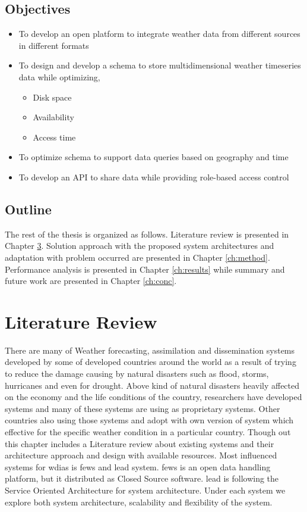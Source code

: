 \documentclass[a4paper,oneside,12pt]{report}
\begin{document}
\section{Objectives}
\begin{itemize}
    \item To develop an open platform to integrate weather data from different sources in different formats
    \item To design and develop a schema to store multidimensional weather timeseries data while optimizing,
    \begin{itemize}
        \item Disk space
        \item Availability
        \item Access time
    \end{itemize}
    \item To optimize schema to support data queries based on geography and time
    \item To develop an API to share data while providing role-based access control
\end{itemize}

\section{Outline}
The rest of the thesis is organized as follows. Literature review is presented in Chapter \ref{ch:literature}. Solution approach with the proposed system architectures and adaptation with problem occurred are presented in Chapter \ref{ch:method}. Performance analysis is presented in Chapter \ref{ch:results} while summary and future work are presented in Chapter \ref{ch:conc}.

\chapter{Literature Review}
\label{ch:literature}
There are many of Weather forecasting, assimilation and dissemination systems developed by some of developed countries around the world as a result of trying to reduce the damage causing by natural disasters such as flood, storms, hurricanes and even for drought. Above kind of natural disasters heavily affected on the economy and the life conditions of the country, researchers have developed systems and many of these systems are using as proprietary systems. Other countries also using those systems and adopt with own version of system which effective for the specific weather condition in a particular country.
Though out this chapter includes a Literature review about existing systems and their architecture approach and design with available resources. Most influenced systems for \acrshort{wdias} is \acrshort{fews} and \acrfull{lead} system. \acrshort{fews} is an open data handling platform, but it distributed as Closed Source software. \acrshort{lead} is following the Service Oriented Architecture for system architecture. Under each system we explore both system architecture, scalability and flexibility of the system.
\end{document}
